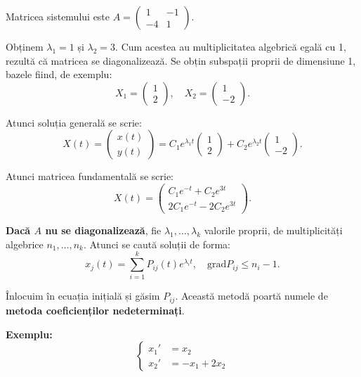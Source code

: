 Matricea sistemului este $A = \begin{pmatrix} 1 & -1 \\ -4 & 1 \end{pmatrix}$.

Obținem $\lambda_1 = 1$ și $\lambda_2 = 3$. Cum acestea au multiplicitatea algebrică
egală cu 1, rezultă că matricea se diagonalizează. Se obțin subspații proprii de dimensiune
1, bazele fiind, de exemplu:
\[
  X_1 = \begin{pmatrix} 1 \\ 2 \end{pmatrix}, \quad
  X_2 = \begin{pmatrix} 1 \\ -2 \end{pmatrix}.
\]

Atunci soluția generală se scrie:
\[
  X(t) = \begin{pmatrix} x(t) \\ y(t) \end{pmatrix} = %
  C_1 e^{\lambda_1 t} \begin{pmatrix} 1 \\ 2 \end{pmatrix} + %
  C_2 e^{\lambda_2 t} \begin{pmatrix} 1 \\ -2 \end{pmatrix}.
\]

Atunci matricea fundamentală se scrie:
\[
  X(t) = \begin{pmatrix}
    C_1 e^{-t} + C_2 e^{3t} \\
    2C_1 e^{-t} - 2C_2 e^{3t}
  \end{pmatrix}.
\]

\vspace{2cm}

\textbf{Dacă $A$ nu se diagonalizează}, fie $\lambda_1, \dots, \lambda_k$ valorile proprii,
de multiplicități algebrice $n_1, \dots, n_k$. Atunci se caută soluții de forma:
\[
  x_j(t) = \sum_{i = 1}^k P_{ij}(t) e^{\lambda_i t}, \quad \mathrm{grad}P_{ij} \leq n_i - 1.
\]

Înlocuim în ecuația inițială și găsim $P_{ij}$. Această metodă poartă numele de
\textbf{metoda coeficienților nedeterminați}.

\vspace{1cm}

\textbf{Exemplu:}
\[
  \begin{cases}
    x_1' &= x_2 \\
    x_2' &= -x_1 + 2x_2
  \end{cases}
\]

